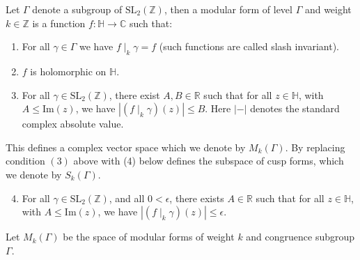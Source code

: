 \begin{definition}\label{def:holomorphic-modular-form}\leanok
	Let  $\Gamma$ denote a subgroup of $\mathrm{SL}_2(\mathbb{Z})$, then a modular form  of level $\Gamma$ and weight $k \in \mathbb{Z}$ is a function $f : \mathbb{H} \to \mathbb{C}$ such that:
	\begin{enumerate}
		\item For all $\gamma \in \Gamma$ we have $f\mid_k \gamma = f$  (such functions are called slash invariant).
		\item $f$ is holomorphic on $\mathbb{H}$.
		\item For all $\gamma \in \mathrm{SL}_2(\mathbb{Z})$, there exist $A, B \in \mathbb{R}$ such that for all $z \in \mathbb{H}$, with $ A \le \mathrm{Im}(z)$, we have $|(f \mid_k \gamma) (z) |\le B$. Here $| - |$ denotes the standard complex absolute value.
	\end{enumerate}
\end{definition}
This defines a complex vector space which we denote by $M_{k}(\Gamma)$. By replacing condition $(3)$ above with (4) below defines the subspace of cusp forms, which we denote by $S_k(\Gamma)$.

\begin{enumerate}
	 \setcounter{enumi}{3}
	\item  For all $\gamma \in \mathrm{SL}_2(\mathbb{Z})$, and all  $0 < \epsilon$, there exists $A \in \mathbb{R}$ such that for all $z \in \mathbb{H}$, with $ A \le \mathrm{Im}(z)$, we have $|(f \mid_k \gamma) (z) |\le \epsilon$.
\end{enumerate}


\begin{definition}\label{def:Mk}\leanok
    Let $M_k(\Gamma)$ be the space of modular forms of weight $k$ and congruence subgroup $\Gamma$.
\end{definition}


